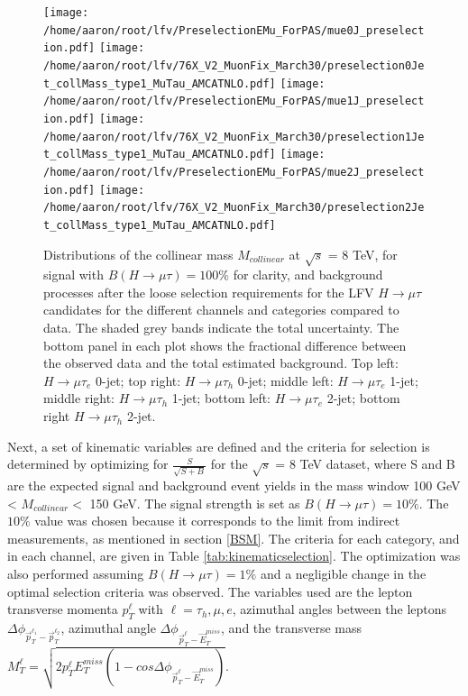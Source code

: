 \documentclass[oneside, letterpaper, oldfontcommands]{memoir}
\begin{document}
\begin{figure}[hbtp]\centering
 \texttt{[image: /home/aaron/root/lfv/PreselectionEMu\_ForPAS/mue0J\_preselection.pdf]}
 \texttt{[image: /home/aaron/root/lfv/76X\_V2\_MuonFix\_March30/preselection0Jet\_collMass\_type1\_MuTau\_AMCATNLO.pdf]}
 \texttt{[image: /home/aaron/root/lfv/PreselectionEMu\_ForPAS/mue1J\_preselection.pdf]}
 \texttt{[image: /home/aaron/root/lfv/76X\_V2\_MuonFix\_March30/preselection1Jet\_collMass\_type1\_MuTau\_AMCATNLO.pdf]}
 \texttt{[image: /home/aaron/root/lfv/PreselectionEMu\_ForPAS/mue2J\_preselection.pdf]}
 \texttt{[image: /home/aaron/root/lfv/76X\_V2\_MuonFix\_March30/preselection2Jet\_collMass\_type1\_MuTau\_AMCATNLO.pdf]}
 \caption{Distributions of the collinear mass $M_{collinear}$ at $\sqrt{s}$ = 8 TeV, for signal with $B(H \rightarrow \mu \tau )=100\%$ for clarity, and background processes after the loose selection requirements for the LFV $H \rightarrow \mu \tau$ candidates for the different channels and categories compared to data. The shaded grey bands indicate the total uncertainty. The bottom panel in each plot shows the fractional difference between the observed data and the total estimated background.  Top left: $H \rightarrow \mu \tau_{e}$ 0-jet; top right: $H \rightarrow \mu \tau_{h}$ 0-jet;  middle left: $H \rightarrow \mu \tau_{e}$ 1-jet; middle right: $H \rightarrow \mu \tau_{h}$
1-jet; bottom left: $H \rightarrow \mu \tau_{e}$ 2-jet; bottom right $H \rightarrow \mu \tau_{h}$ 2-jet. }
 \label{fig:Mcol_after_presel_WITHDATA_13TeV}\end{figure}

\qquad Next, a set of kinematic variables are defined and the criteria for selection is determined by optimizing for $\frac{S}{\sqrt{S+B}}$ for the $\sqrt{s}$ = 8 TeV dataset, where S and B are the expected signal and background event yields in the mass window 100 GeV < $M_{collinear} <$ 150 GeV. The signal strength is set as $B(H\rightarrow\mu\tau) = 10\%$. The $10\%$ value was chosen because it corresponds to the limit from indirect measurements, as mentioned in section \ref{BSM}. The criteria for each category, and in each channel, are given in Table \ref{tab:kinematicselection}. The optimization was also performed assuming $B(H\rightarrow\mu\tau) = 1\%$ and a negligible change in the optimal selection criteria was observed. The variables used are the lepton transverse momenta $p_{T}^{\ell}$ with $\ell = \tau_{h},\mu,e$, azimuthal angles between the leptons 
$\Delta\phi_{\vec{p}_{T}^{\ell_{1}}-\vec{p}_{T}^{\ell_{2}}}$, azimuthal angle 
$\Delta\phi_{\vec{p}_{T}^{\ell}-\vec{E}_{T}^{miss}}$, and the transverse mass 
$M_{T}^{\ell} = \sqrt{2 p_{T}^{\ell}E_{T}^{miss}(1-cos \Delta\phi_{\vec{p}_{T}^{\ell}-\vec{E}_{T}^{miss}})}$. 
\end{document}
